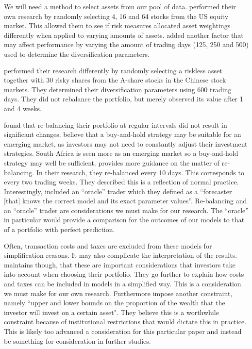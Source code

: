 \documentclass[12pt,a4paper]{article}
\begin{document}
We will need a method to select assets from our pool of data. \cite{righi2017simulation} performed their own research by randomly selecting 4, 16 and 64 stocks from the US equity market. This allowed them to see if risk measures allocated asset weightings differently when applied to varying amounts of assets. \cite{righi2017simulation} added another factor that may affect performance by varying the amount of trading days (125, 250 and 500) used to determine the diversification parameters. 

\cite{CHEN20111777} performed their research differently by randomly selecting a riskless asset together with 30 risky shares from the A-share stocks in the Chinese stock markets. They determined their diversification parameters using 600 trading days. They did not rebalance the portfolio, but merely observed its value after 1 and 4 weeks. 


\cite{righi2017simulation} found that re-balancing their portfolio at regular intervals did not result in significant changes. \cite{CHEN20111777} believe that a buy-and-hold strategy may be suitable for an emerging market, as investors may not need to constantly adjust their investment strategies. South Africa is seen more as an emerging market so a buy-and-hold strategy may well be sufficient. \cite{KRATZ2018393} provides more guidance on the matter of re-balancing. In their research, they re-balanced every 10 days. This corresponds to every two trading weeks. They described this is a reflection of normal practice. Interestingly, \cite{KRATZ2018393} included an ``oracle'' trader which they defined as a ``forecaster [that] knows the correct model and its exact parameter values''.  Re-balancing and an ``oracle'' trader are considerations we must make for our research. The ``oracle'' in particular would provide a comparison for the outcomes of our models to that of a portfolio with perfect prediction.

Often, transaction costs and taxes are excluded from these models for simplification reasons. It may also complicate the interpretation of the results. \cite{CHEN20111777} maintains though, that these are important considerations that investors take into account when choosing their portfolio. They go further to explain how costs and taxes can be included in models in a simplified way. This is a consideration we must make for our own research. Furthermore \cite{CHEN20111777} impose another constraint, namely ``upper and lower bounds on the proportion of the wealth that the investor will invest on a certain asset". They believe this is a worthwhile constraint because of institutional
restrictions that would dictate this in practice. This is likely too advanced a consideration for this particular paper and instead be something for consideration in further studies.
\end{document}
